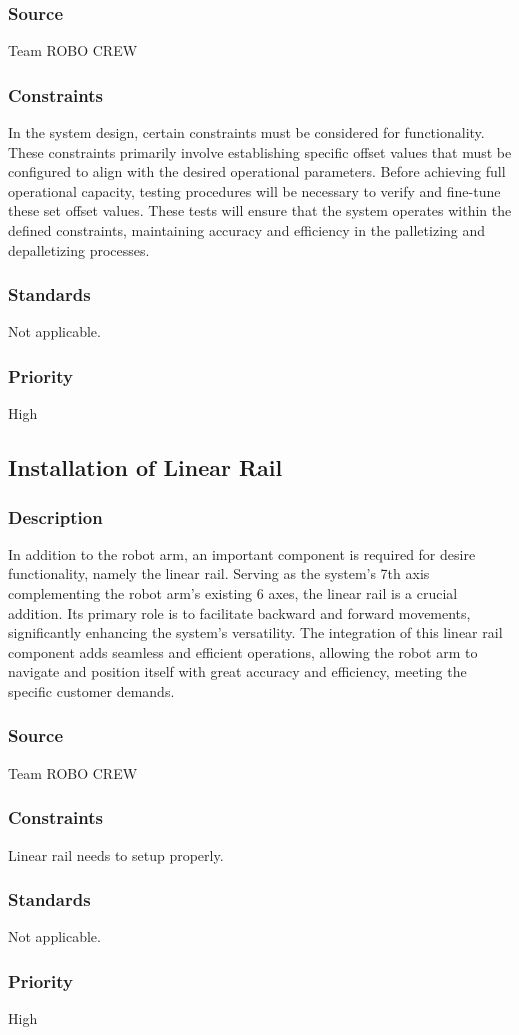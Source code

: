 \subsubsection{Source}
Team ROBO CREW 
\subsubsection{Constraints}
In the system design, certain constraints must be considered for functionality. These constraints primarily involve establishing specific offset values that must be configured to align with the desired operational parameters. Before achieving full operational capacity, testing procedures will be necessary to verify and fine-tune these set offset values. These tests will ensure that the system operates within the defined constraints, maintaining accuracy and efficiency in the palletizing and depalletizing processes. 
\subsubsection{Standards}
Not applicable. 
\subsubsection{Priority}
High

\subsection{Installation of Linear Rail}
\subsubsection{Description}
In addition to the robot arm, an important component is required for desire functionality, namely the linear rail. Serving as the system's 7th axis complementing the robot arm's existing 6 axes, the linear rail is a crucial addition. Its primary role is to facilitate backward and forward movements, significantly enhancing the system's versatility. The integration of this linear rail component adds seamless and efficient operations, allowing the robot arm to navigate and position itself with great accuracy and efficiency, meeting the specific customer demands.
\subsubsection{Source}
Team ROBO CREW 
\subsubsection{Constraints}
Linear rail needs to setup properly. 
\subsubsection{Standards}
Not applicable. 
\subsubsection{Priority}
High